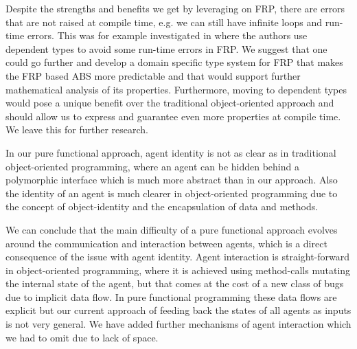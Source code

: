 Despite the strengths and benefits we get by leveraging on FRP, there are errors that are not raised at compile time, e.g. we can still have infinite loops and run-time errors. This was for example investigated in \cite{sculthorpe_safe_2009} where the authors use dependent types to avoid some run-time errors in FRP. We suggest that one could go further and develop a domain specific type system for FRP that makes the FRP based ABS more predictable and that would support further mathematical analysis of its properties. Furthermore, moving to dependent types would pose a unique benefit over the traditional object-oriented approach and should allow us to express and guarantee even more properties at compile time. We leave this for further research.

In our pure functional approach, agent identity is not as clear as in traditional object-oriented programming, where an agent can be hidden behind a polymorphic interface which is much more abstract than in our approach. Also the identity of an agent is much clearer in object-oriented programming due to the concept of object-identity and the encapsulation of data and methods.

We can conclude that the main difficulty of a pure functional approach evolves around the communication and interaction between agents, which is a direct consequence of the issue with agent identity. Agent interaction is straight-forward in object-oriented programming, where it is achieved using method-calls mutating the internal state of the agent, but that comes at the cost of a new class of bugs due to implicit data flow. In pure functional programming these data flows are explicit but our current approach of feeding back the states of all agents as inputs is not very general. We have added further mechanisms of agent interaction which we had to omit due to lack of space.